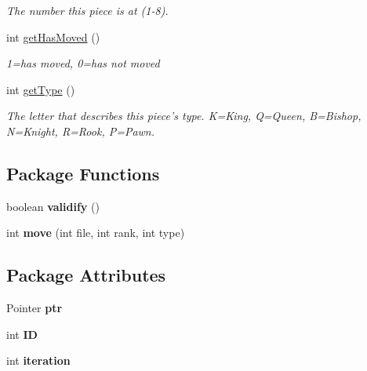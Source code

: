 \begin{DoxyCompactItemize}
\begin{DoxyCompactList}\small\item\em The number this piece is at (1-\/8). \item\end{DoxyCompactList}\item 
\hypertarget{classPiece_a924d3f54ef01600177ea134b82190f44}{
int \hyperlink{classPiece_a924d3f54ef01600177ea134b82190f44}{getHasMoved} ()}
\label{classPiece_a924d3f54ef01600177ea134b82190f44}

\begin{DoxyCompactList}\small\item\em 1=has moved, 0=has not moved \item\end{DoxyCompactList}\item 
\hypertarget{classPiece_aeebab4a49f40fde49a9698c19f51f4a0}{
int \hyperlink{classPiece_aeebab4a49f40fde49a9698c19f51f4a0}{getType} ()}
\label{classPiece_aeebab4a49f40fde49a9698c19f51f4a0}

\begin{DoxyCompactList}\small\item\em The letter that describes this piece's type. K=King, Q=Queen, B=Bishop, N=Knight, R=Rook, P=Pawn. \item\end{DoxyCompactList}\end{DoxyCompactItemize}
\subsection*{Package Functions}
\begin{DoxyCompactItemize}
\item 
\hypertarget{classPiece_a362cf37d2aea324380f9d2355b6a26e3}{
boolean {\bfseries validify} ()}
\label{classPiece_a362cf37d2aea324380f9d2355b6a26e3}

\item 
\hypertarget{classPiece_a4bd26bbbbaccbab5b554bffd216ba865}{
int {\bfseries move} (int file, int rank, int type)}
\label{classPiece_a4bd26bbbbaccbab5b554bffd216ba865}

\end{DoxyCompactItemize}
\subsection*{Package Attributes}
\begin{DoxyCompactItemize}
\item 
\hypertarget{classPiece_ab75cbaac9376bbf709eb7ef8974f9676}{
Pointer {\bfseries ptr}}
\label{classPiece_ab75cbaac9376bbf709eb7ef8974f9676}

\item 
\hypertarget{classPiece_a46caa61a92443d551a7fc07c97ac3186}{
int {\bfseries ID}}
\label{classPiece_a46caa61a92443d551a7fc07c97ac3186}

\item 
\hypertarget{classPiece_ab24e5a1f5303bd1ceb51b5acdca5f079}{
int {\bfseries iteration}}
\label{classPiece_ab24e5a1f5303bd1ceb51b5acdca5f079}

\end{DoxyCompactItemize}


